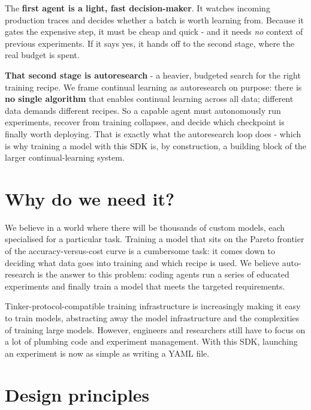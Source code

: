 \documentclass[11pt]{article}
\begin{document}
The \textbf{first agent is a light, fast decision-maker}. It watches incoming
production traces and decides whether a batch is worth learning from. Because it
gates the expensive step, it must be cheap and quick - and it needs \emph{no}
context of previous experiments. If it says yes, it hands off to the second
stage, where the real budget is spent.

\textbf{That second stage is autoresearch} - a heavier, budgeted search for the
right training recipe. We frame continual learning as autoresearch on purpose:
there is \textbf{no single algorithm} that enables continual learning across all
data; different data demands different recipes. So a capable agent must
autonomously run experiments, recover from training collapses, and decide which
checkpoint is finally worth deploying. That is exactly what the autoresearch loop
does - which is why training a model with this SDK is, by construction, a
building block of the larger continual-learning system.

\section{Why do we need it?}
We believe in a world where there will be thousands of custom models, each
specialised for a particular task. Training a model that sits on the Pareto
frontier of the accuracy-versus-cost curve is a cumbersome task: it comes down
to deciding what data goes into training and which recipe is used. We believe
auto-research is the answer to this problem: coding agents run a series of
educated experiments and finally train a model that meets the targeted
requirements.

Tinker-protocol-compatible training infrastructure is increasingly making it
easy to train models, abstracting away the model infrastructure and the
complexities of training large models. However, engineers and researchers still
have to focus on a lot of plumbing code and experiment management. With this
SDK, launching an experiment is now as simple as writing a YAML file.

\section{Design principles}
\end{document}
